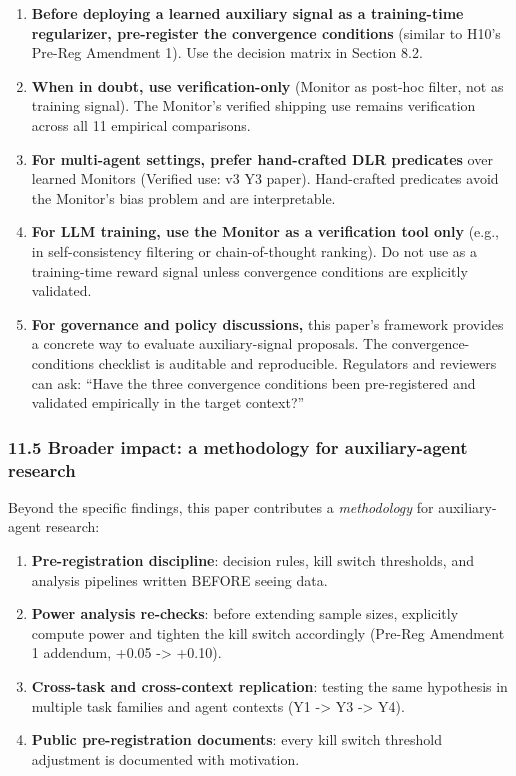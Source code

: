 \documentclass[11pt]{article}
\begin{document}
\begin{enumerate}
\def\labelenumi{\arabic{enumi}.}
\item
  \textbf{Before deploying a learned auxiliary signal as a training-time
  regularizer, pre-register the convergence conditions} (similar to
  H10's Pre-Reg Amendment 1). Use the decision matrix in Section 8.2.
\item
  \textbf{When in doubt, use verification-only} (Monitor as post-hoc
  filter, not as training signal). The Monitor's verified shipping use
  remains verification across all 11 empirical comparisons.
\item
  \textbf{For multi-agent settings, prefer hand-crafted DLR predicates}
  over learned Monitors (Verified use: v3 Y3 paper). Hand-crafted
  predicates avoid the Monitor's bias problem and are interpretable.
\item
  \textbf{For LLM training, use the Monitor as a verification tool only}
  (e.g., in self-consistency filtering or chain-of-thought ranking). Do
  not use as a training-time reward signal unless convergence conditions
  are explicitly validated.
\item
  \textbf{For governance and policy discussions,} this paper's framework
  provides a concrete way to evaluate auxiliary-signal proposals. The
  convergence- conditions checklist is auditable and reproducible.
  Regulators and reviewers can ask: ``Have the three convergence
  conditions been pre-registered and validated empirically in the target
  context?''
\end{enumerate}

\subsubsection{11.5 Broader impact: a methodology for auxiliary-agent
research}\label{broader-impact-a-methodology-for-auxiliary-agent-research}

Beyond the specific findings, this paper contributes a
\emph{methodology} for auxiliary-agent research:

\begin{enumerate}
\def\labelenumi{\arabic{enumi}.}

\item
  \textbf{Pre-registration discipline}: decision rules, kill switch
  thresholds, and analysis pipelines written BEFORE seeing data.
\item
  \textbf{Power analysis re-checks}: before extending sample sizes,
  explicitly compute power and tighten the kill switch accordingly
  (Pre-Reg Amendment 1 addendum, +0.05 -\textgreater{} +0.10).
\item
  \textbf{Cross-task and cross-context replication}: testing the same
  hypothesis in multiple task families and agent contexts (Y1
  -\textgreater{} Y3 -\textgreater{} Y4).
\item
  \textbf{Public pre-registration documents}: every kill switch
  threshold adjustment is documented with motivation.
\end{enumerate}
\end{document}
